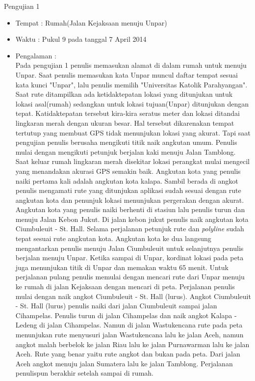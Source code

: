 	Pengujian 1
		\begin{itemize}
			\item Tempat : Rumah(Jalan Kejaksaan menuju Unpar)
			\item Waktu : Pukul 9 pada tanggal 7 April 2014 
			\item Pengalaman : \\
			\hspace{0.5cm} Pada pengujian 1 penulis memasukan alamat di dalam rumah untuk menuju Unpar. Saat penulis memasukan kata Unpar muncul daftar tempat sesuai kata kunci "Unpar", lalu penulis memilih "Universitas Katolik Parahyangan". Saat rute ditampilkan ada ketidaktepatan lokasi yang ditunjukan untuk lokasi asal(rumah) sedangkan untuk lokasi tujuan(Unpar) ditunjukan dengan tepat. Katidaktepatan tersebut kira-kira seratus meter dan lokasi ditandai lingkaran merah dengan ukuran besar. Hal tersebut dikarenakan tempat tertutup yang membuat GPS tidak menunjukan lokasi yang akurat. Tapi saat pengujian penulis berusaha mengikuti titik naik angkutan umum.
			\hspace{0.5cm}Penulis mulai dengan mengikuti petunjuk berjalan kaki menuju Jalan Tamblong. Saat keluar rumah lingkaran merah disekitar lokasi perangkat mulai mengecil yang menandakan akurasi GPS semakin baik. Angkutan kota yang penulis naiki pertama kali adalah angkutan kota kalapa. Sambil berada di angkot penulis mengamati rute yang ditunjukan aplikasi sudah sesuai dengan rute angkutan kota dan penunjuk lokasi menunjukan pergerakan dengan akurat. Angkutan kota yang penulis naiki berhenti di stasiun lalu penulis turun dan menuju Jalan Kebon Jukut. Di jalan kebon jukut penulis naik angkutan kota Ciumbuleuit - St. Hall. Selama perjalanan petunjuk rute dan \textit{polyline} sudah tepat sesuai rute angkutan kota. Angkutan kota ke dua langsung mengantarkan penulis menuju Jalan Ciumbuleuit untuk selanjutnya penulis berjalan menuju Unpar. Ketika sampai di Unpar, kordinat lokasi pada peta juga menunjukan titik di Unpar dan memakan waktu 65 menit.
			\hspace{0.5cm}Untuk perjalanan pulang penulis memulai dengan mencari rute dari Unpar menuju ke rumah di jalan Kejaksaan dengan mencari di peta. Perjalanan penulis mulai dengan naik angkot Ciumbuleuit - St. Hall (lurus). Angkot Ciumbuleuit - St. Hall (lurus) penulis naiki dari jalan Ciumbuleuit sampai jalan Cihampelas. Penulis turun di jalan Cihampelas dan naik angkot Kalapa - Ledeng di jalan Cihampelas. Namun di jalan Wastukencana rute pada peta menunjukan rute menyusuri jalan Wastukencana lalu ke jalan Aceh, namun angkot malah berbelok ke jalan Riau lalu ke jalan Purnawarman lalu ke jalan Aceh. Rute yang benar yaitu rute angkot dan bukan pada peta. Dari jalan Aceh angkot menuju jalan Sumatera lalu ke jalan Tamblong. Perjalanan penulispun berakhir setelah sampai di rumah.
		\end{itemize}


